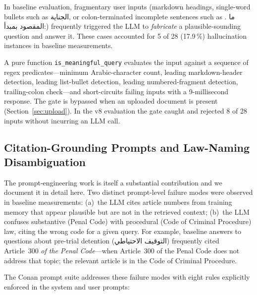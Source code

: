 \documentclass[final,1p,times]{elsarticle}
\newcommand{\ar}[1]{{\arabicfont\beginR #1\endR}}
\begin{document}
In baseline evaluation, fragmentary user inputs (markdown headings,
single-word bullets such as \ar{* الجناية}, or colon-terminated incomplete
sentences such as \ar{1. ما المقصود بمبدأ:}) frequently triggered the LLM
to \emph{fabricate} a plausible-sounding question and answer it. These cases
accounted for 5 of 28 (17.9\,\%) hallucination instances in baseline
measurements.

A pure function \texttt{is\_meaningful\_query} evaluates the input against a
sequence of regex predicates---minimum Arabic-character count, leading
markdown-header detection, leading list-bullet detection, leading
numbered-fragment detection, trailing-colon check---and short-circuits
failing inputs with a 9-millisecond response. The gate is bypassed when an
uploaded document is present (Section~\ref{sec:upload}). In the v8 evaluation
the gate caught and rejected 8 of 28 inputs without incurring an LLM call.

\subsection{Citation-Grounding Prompts and Law-Naming Disambiguation}\label{sec:prompts}

The prompt-engineering work is itself a substantial contribution and we
document it in detail here. Two distinct prompt-level failure modes were
observed in baseline measurements: (a)~the LLM cites article numbers from
training memory that appear plausible but are not in the retrieved context;
(b)~the LLM confuses substantive (Penal Code) with procedural (Code of
Criminal Procedure) law, citing the wrong code for a given query. For
example, baseline answers to questions about pre-trial detention
(\ar{التوقيف الاحتياطي}) frequently cited Article~300 \emph{of the Penal
Code}---when Article~300 of the Penal Code does not address that topic; the
relevant article is in the Code of Criminal Procedure.

The Conan prompt suite addresses these failure modes with eight rules
explicitly enforced in the system and user prompts:
\end{document}
